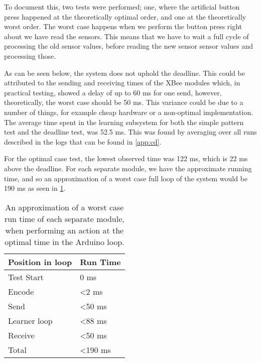 To document this, two tests were performed; one, where the artificial button press happened at the theoretically optimal order, and one at the theoretically worst order. The worst case happens when we perform the button press right about we have read the sensors. This means that we have to wait a full cycle of processing the old sensor values, before reading the new sensor sensor values and processing those.

As can be seen below, the system does not uphold the deadline. This could be attributed to the sending and receiving times of the XBee modules which, in practical testing, showed a delay of up to 60 ms for one send, however, theoretically, the worst case should be 50 ms\cite{xbee_latency}. This variance could be due to a number of things, for example cheap hardware or a non-optimal implementation. The average time spent in the learning subsystem for both the simple pattern test and the deadline test, was 52.5 ms. This was found by averaging over all runs described in the logs that can be found in \cref{app:cd}.

For the optimal case test, the lowest observed time was 122 ms, which is 22 ms above the deadline. For each separate module, we have the approximate running time, and so an approximation of a worst case full loop of the system would be 190 ms as seen in \cref{Table:RunTimeAprox}.

\begin{center}
	\begin{table}[htbp]
	  \centering
	  \begin{tabular}{l l}
		\toprule
		Position in loop		& Run Time  \\ \midrule
		Test Start		        & 0 ms         \\ \midrule
		Encode 			        & <2 ms  	\\ \midrule
		Send   			        & <50 ms     \\ \midrule
		Learner loop 	        & <88 ms     \\ \midrule
		Receive 		        & <50 ms     \\ \midrule \midrule
		Total			        & <190 ms	    \\
                                            \bottomrule
	  \end{tabular}
	  \caption{An approximation of a worst case run time of each separate module, when performing an action at the optimal time in the Arduino loop.}\label{Table:RunTimeAprox}
	\end{table}
\end{center}

